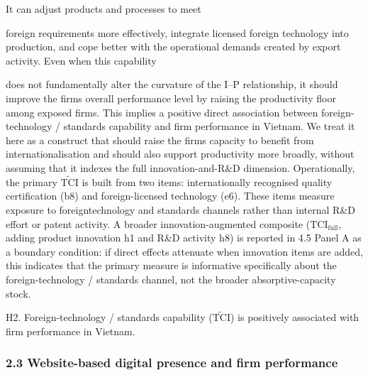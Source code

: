 \documentclass[12pt,a4paper]{article}
\begin{document}
It can adjust products and processes to meet

foreign requirements more effectively, integrate licensed foreign
technology into production, and cope better with the operational demands
created by export activity. Even when this capability

does not fundamentally alter the curvature of the I--P relationship, it
should improve the firm\textquotesingle s overall performance level by
raising the productivity floor among exposed firms. This implies a
positive direct association between foreign-technology / standards
capability and firm performance in Vietnam. We treat it here as a
construct that should raise the firm\textquotesingle s capacity to
benefit from internationalisation and should also support productivity
more broadly, without assuming that it indexes the full
innovation-and-R\&D dimension. Operationally, the primary
\(\tilde{\mathrm{TCI}}\) is built from two items: internationally
recognised quality certification (b8) and foreign-licensed technology
(e6). These items measure exposure to foreigntechnology and standards
channels rather than internal R\&D effort or patent activity. A broader
innovation-augmented composite (\(\mathrm{TCI}_{\text{full}}\), adding
product innovation h1 and R\&D activity h8) is reported in 4.5 Panel A
as a boundary condition: if direct effects attenuate when innovation
items are added, this indicates that the primary measure is informative
specifically about the foreign-technology / standards channel, not the
broader absorptive-capacity stock.

H2. Foreign-technology / standards capability (\(\tilde{\mathrm{TCI}}\))
is positively associated with firm performance in Vietnam.

\hypertarget{23-website-based-digital-presence-and-firm-performance}{%
\subsubsection{2.3 Website-based digital presence and firm
performance}\label{23-website-based-digital-presence-and-firm-performance}}
\end{document}
